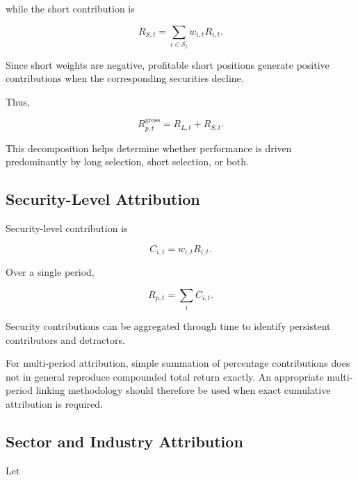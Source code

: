 \documentclass[11pt,a4paper]{article}
\begin{document}
while the short contribution is

\begin{equation}
\boxed{
R_{S,t}
=
\sum_{i\in\mathcal{S}_t}
w_{i,t}R_{i,t}.
}
\end{equation}

Since short weights are negative, profitable short positions generate positive
contributions when the corresponding securities decline.

Thus,

\begin{equation}
\boxed{
R_{p,t}^{\mathrm{gross}}
=
R_{L,t}
+
R_{S,t}.
}
\end{equation}

This decomposition helps determine whether performance is driven predominantly
by long selection, short selection, or both.


\subsection{Security-Level Attribution}

Security-level contribution is

\begin{equation}
\boxed{
C_{i,t}
=
w_{i,t}R_{i,t}.
}
\end{equation}

Over a single period,

\begin{equation}
R_{p,t}
=
\sum_i C_{i,t}.
\end{equation}

Security contributions can be aggregated through time to identify persistent
contributors and detractors.

For multi-period attribution, simple summation of percentage contributions does
not in general reproduce compounded total return exactly. An appropriate
multi-period linking methodology should therefore be used when exact cumulative
attribution is required.


\subsection{Sector and Industry Attribution}

Let
\end{document}
